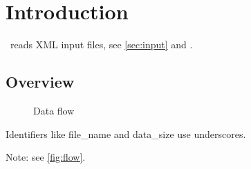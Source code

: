 \chapter{Introduction}\label{ch:intro}
\ExampleSim\ reads XML input files, see \autoref{sec:input} and \cite{knuth84}.
\section{Overview}\label{sec:overview}
\begin{figure}[htb]\centering
{}
\caption{Data flow}\label{fig:flow}\end{figure}
Identifiers like file_name and data_size use underscores.
\begin{tcolorbox}Note: see \autoref{fig:flow}.\end{tcolorbox}
